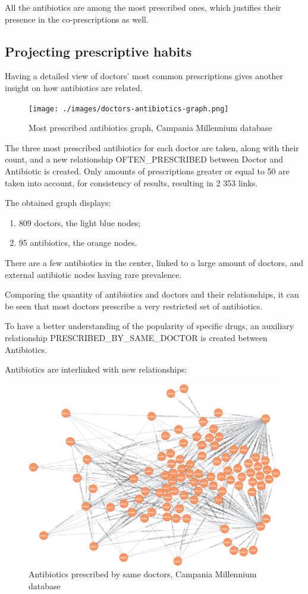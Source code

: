 All the antibiotics are among the most prescribed ones, which justifies their presence in the co-prescriptions as well.

\subsection{Projecting prescriptive habits}
Having a detailed view of doctors' most common prescriptions gives another insight on how antibiotics are related.

\begin{figure}[h]
	\centering
	\texttt{[image: ./images/doctors-antibiotics-graph.png]}
	\caption{\small Most prescribed antibiotics graph, Campania Millennium database}
\end{figure}

The three most prescribed antibiotics for each doctor are taken, along with their count, and a new relationship OFTEN\_PRESCRIBED between Doctor and Antibiotic is created. Only amounts of prescriptions greater or equal to 50 are taken into account, for consistency of results, resulting in 2 353 links.

The obtained graph displays:
\begin{enumerate}
	\item 809 doctors, the light blue nodes;
	\item 95 antibiotics, the orange nodes.
\end{enumerate}

There are a few antibiotics in the center, linked to a large amount of doctors, and external antibiotic nodes having rare prevalence.

Comparing the quantity of antibiotics and doctors and their relationships, it can be seen that most doctors prescribe a very restricted set of antibiotics. 

To have a better understanding of the popularity of specific drugs, an auxiliary relationship PRESCRIBED\_BY\_SAME\_DOCTOR is created between Antibiotics. 

Antibiotics are interlinked with new relationships:

\begin{figure}[h]
	\centering
	\includegraphics[scale=0.3]{./images/antibiotics-graph.png}
	\caption{\small Antibiotics prescribed by same doctors, Campania Millennium database}
\end{figure}

